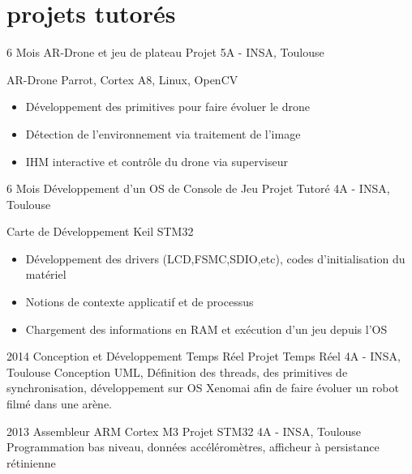 \documentclass[a4paper]{friggeri-cv} %
\begin{document}
\section{projets tutorés}

\begin{entrylist}

\entry
{6 Mois}
{AR-Drone et jeu de plateau}
{Projet 5A - INSA, Toulouse}
{AR-Drone Parrot, Cortex A8, Linux, OpenCV \smallskip
\begin{itemize}
\item Développement des primitives pour faire évoluer le drone
\item Détection de l'environnement via traitement de l'image
\item IHM interactive et contrôle du drone via superviseur
\end{itemize}
}



\entry
{6 Mois}
{Développement d'un OS de Console de Jeu}
{Projet Tutoré 4A - INSA, Toulouse}
{Carte de Développement Keil STM32\smallskip
\begin{itemize}
\item Développement des drivers (LCD,FSMC,SDIO,etc), codes d'initialisation du matériel
\item Notions de contexte applicatif et de processus
\item Chargement des informations en RAM et exécution d'un jeu depuis l'OS
\end{itemize}
}





\entry
{2014}
{Conception et Développement Temps Réel}
{Projet Temps Réel 4A - INSA, Toulouse}
{Conception UML, Définition des threads, des primitives de synchronisation, développement sur OS Xenomai afin de faire évoluer un robot filmé dans une arène.}

\entry
{2013}
{Assembleur ARM Cortex M3}
{Projet STM32 4A - INSA, Toulouse}
{Programmation bas niveau, données accéléromètres, afficheur à persistance rétinienne}
\end{entrylist}
\end{document}
